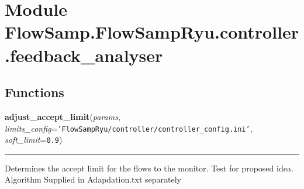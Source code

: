 %
%
%


\section{Module FlowSamp.FlowSampRyu.controller.feedback\_analyser}

    \label{FlowSamp:FlowSampRyu:controller:feedback_analyser}


  \subsection{Functions}

    \label{FlowSamp:FlowSampRyu:controller:feedback_analyser:adjust_accept_limit}

    \vspace{0.5ex}

\hspace{.8\funcindent}\begin{boxedminipage}{\funcwidth}

    \raggedright \textbf{adjust\_accept\_limit}(\textit{params}, \textit{limits\_config}={\tt \texttt{'}\texttt{FlowSampRyu/controller/controller\_config.ini}\texttt{'}}, \textit{soft\_limit}={\tt 0.9})

    \vspace{-1.5ex}

    \rule{\textwidth}{0.5\fboxrule}
\setlength{\parskip}{2ex}
    Determines the accept limit for the flows to the monitor. Test for 
    proposed idea. Algorithm Supplied in Adapdation.txt separately

\setlength{\parskip}{1ex}
    \end{boxedminipage}


